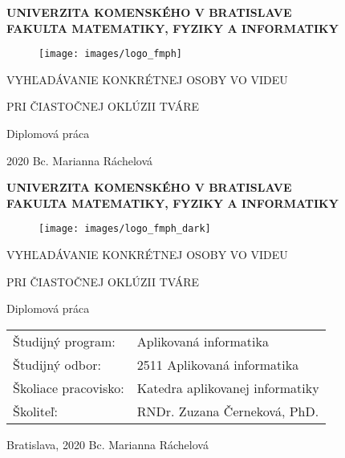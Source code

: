 \documentclass[12pt, a4paper, oneside]{book}
\newcommand\mfthesistype{Diplomová práca}
\newcommand\mfauthor{Bc. Marianna Ráchelová}
\newcommand\mfadvisor{RNDr. Zuzana Černeková, PhD.}
\newcommand\mfplacedate{Bratislava, 2020}
\newcommand\mfuniversity{UNIVERZITA KOMENSKÉHO V BRATISLAVE}
\newcommand\mffaculty{FAKULTA MATEMATIKY, FYZIKY A INFORMATIKY}
\begin{document}
\frontmatter

\thispagestyle{empty}

\noindent
\begin{minipage}{\textwidth}
\begin{center}
\textbf{\mfuniversity \\
\mffaculty}
\end{center}
\end{minipage}

\vfill
\begin{figure}[!hbt]
	\begin{center}
		\texttt{[image: images/logo\_fmph]}
		\label{img:logo}
	\end{center}
\end{figure}
\begin{center}
	\begin{minipage}{0.8\textwidth}
		\centerline{\Large\MakeUppercase{Vyhľadávanie konkrétnej osoby vo videu}}
		\centerline{\Large\MakeUppercase{pri čiastočnej oklúzii tváre}}
		\smallskip
		\centerline{\mfthesistype}
	\end{minipage}
\end{center}
\vfill
2020 \hfill
\mfauthor
\eject 

\thispagestyle{empty}

\noindent
\begin{minipage}{\textwidth}
\begin{center}
\textbf{\mfuniversity \\
\mffaculty}
\end{center}
\end{minipage}

\vfill
\begin{figure}[!hbt]
\begin{center}
\texttt{[image: images/logo\_fmph\_dark]}
\label{img:logo_dark}
\end{center}
\end{figure}
\begin{center}
\begin{minipage}{0.8\textwidth}
		\centerline{\Large\MakeUppercase{Vyhľadávanie konkrétnej osoby vo videu}}
		\centerline{\Large\MakeUppercase{pri čiastočnej oklúzii tváre}}
\smallskip
\centerline{\mfthesistype}
\end{minipage}
\end{center}
\vfill
\begin{tabular}{l l}
Študijný program: & Aplikovaná informatika\\
Študijný odbor: & 2511 Aplikovaná informatika\\
Školiace pracovisko: & Katedra aplikovanej informatiky\\
Školiteľ: & \mfadvisor\\
\end{tabular}
\vfill
\noindent
\mfplacedate \hfill
\mfauthor
\eject 
\end{document}
